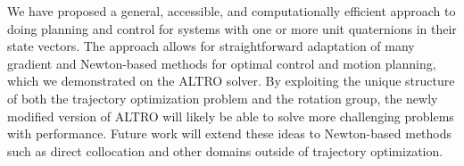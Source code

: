 \documentclass[letterpaper, 10 pt, conference]{ieeeconf}  %
\begin{document}
    We have proposed a general, accessible, and computationally efficient approach to
    doing planning and control for systems with one or more unit quaternions in their
    state vectors. The approach allows for straightforward adaptation of many
    gradient and Newton-based methods for optimal control and motion planning, which we demonstrated
    on the ALTRO solver. By exploiting the unique structure of both the trajectory
    optimization problem and the rotation group, the newly modified version of ALTRO will
    likely be able to solve more challenging problems with performance.
    Future work will extend these ideas to Newton-based methods such as direct
    collocation and other domains outside of trajectory optimization.
        

\printbibliography
\end{document}
